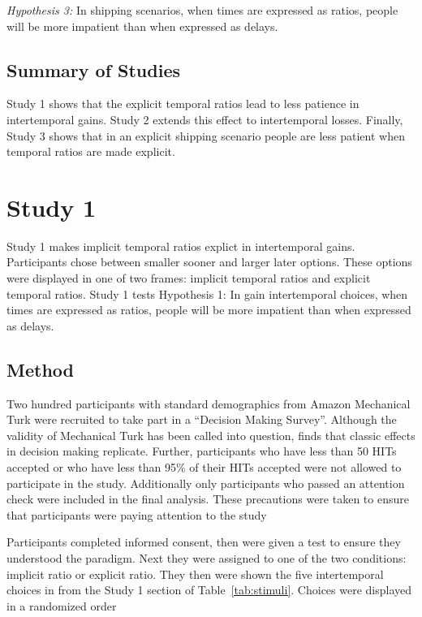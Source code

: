 \documentclass[]{article}
\begin{document}
\textit{Hypothesis 3:} In shipping scenarios, when times are expressed as ratios, people will be more impatient than when expressed as delays. 


\subsection{Summary of Studies}

Study 1 shows that the explicit temporal ratios lead to less patience in intertemporal gains.
Study 2 extends this effect to intertemporal losses.
Finally, Study 3 shows that in an explicit shipping scenario people are less patient when temporal ratios are made explicit. 



\section{Study 1}
Study 1 makes implicit temporal ratios explict in intertemporal gains.
Participants chose between smaller sooner and larger later options. 
These options were displayed in one of two frames: implicit temporal ratios and explicit temporal ratios. 
Study 1 tests Hypothesis 1: In gain intertemporal choices, when times are expressed as ratios, people will be more impatient than when expressed as delays. 

\subsection{Method}
Two hundred participants with standard demographics from Amazon Mechanical Turk were recruited to take part in a ``Decision Making Survey''. 
Although the validity of Mechanical Turk has been called into question,  finds that classic effects in decision making replicate. 
Further, participants who have less than 50 HITs accepted or  who have less than 95\% of their HITs accepted were not allowed to participate in the study. 
Additionally only participants who passed an attention check were included in the final analysis.
These precautions were taken to ensure that participants were paying attention to the study 

Participants completed informed consent, then were given a test to ensure they understood the paradigm.
Next they were assigned to one of the two conditions: implicit ratio or explicit ratio. 
They then were shown the five intertemporal choices in from the Study 1 section of  Table~\ref{tab:stimuli}. 
Choices were displayed in a randomized order
\end{document}
